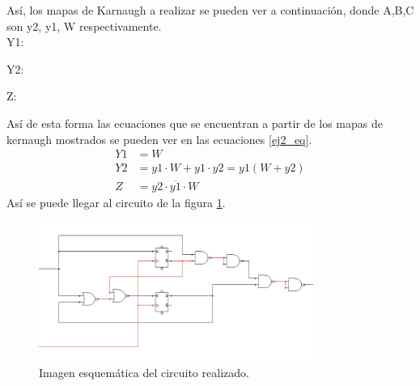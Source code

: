 %
 \noindent
 Así, los mapas de Karnaugh a realizar se pueden ver a continuación, donde A,B,C son y2, y1, W respectivamente.\\
Y1:
%
\begin{center}
    \begin{Karnaughvuit}
    \end{Karnaughvuit}
\end{center}
%
Y2:
%
\begin{center}
    \begin{Karnaughvuit}
    \end{Karnaughvuit}
\end{center}
%
Z:
%
\begin{center}
    \begin{Karnaughvuit}
    \end{Karnaughvuit}
\end{center}
%
\noindent
Así de esta forma las ecuaciones que se encuentran a partir de los mapas de kernaugh mostrados se pueden ver en las ecuaciones \ref{ej2_eq}.
%
\begin{equation}
\begin{split}
    Y1&=W\\
    Y2&=y1\cdot W+y1\cdot y2 = y1(W+y2)\\
    Z&=y2\cdot \overline{y1}\cdot W
\label{ej2_eq}
\end{split}
\end{equation}
%
Así se puede llegar al circuito de la figura \ref{ej2_circuito.}.
%
\begin{figure}[H]
    \centering
    \includegraphics[width=0.8\textwidth]{figs/Ej2/circuit_ej2.JPG} %
    \caption{Imagen esquemática del circuito realizado.}
    \label{ej2_circuito.}
\end{figure}
